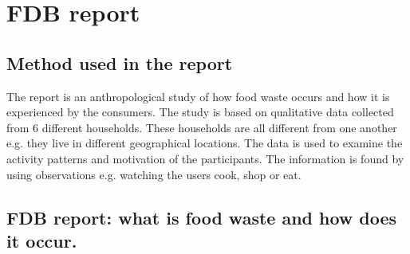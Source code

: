 \section{FDB report}
\subsection{Method used in the report}
The report is an anthropological study of how food waste occurs and how it is experienced by the consumers. The study is based on qualitative data collected from 6 different households. These households are all different from one another e.g. they live in different geographical locations. The data is used to examine the activity patterns and motivation of the participants. The information is found by using observations e.g. watching the users cook, shop or eat.     

\subsection{FDB report: what is food waste and how does it occur.}
